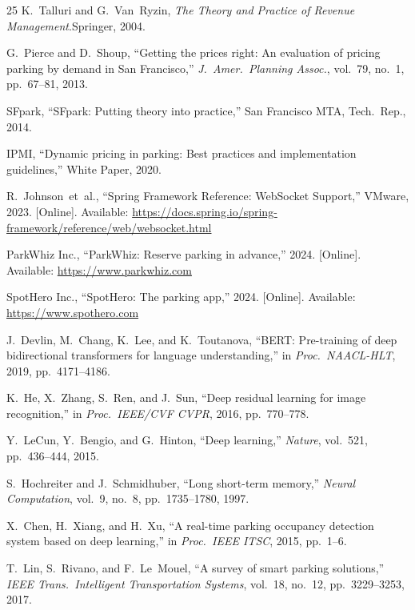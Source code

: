 \documentclass[conference,10pt]{IEEEtran}
\begin{document}
\begin{thebibliography}{25}
K.~Talluri and G.~Van~Ryzin, \emph{The Theory and Practice of Revenue Management}.\quad Springer, 2004.

G.~Pierce and D.~Shoup, ``Getting the prices right: An evaluation of pricing parking by demand in San Francisco,'' \emph{J.\ Amer.\ Planning Assoc.}, vol.~79, no.~1, pp.~67--81, 2013.

SFpark, ``SFpark: Putting theory into practice,'' San Francisco MTA, Tech.\ Rep., 2014.

IPMI, ``Dynamic pricing in parking: Best practices and implementation guidelines,'' White Paper, 2020.

R.~Johnson~et~al., ``Spring Framework Reference: WebSocket Support,'' VMware, 2023. [Online]. Available: \url{https://docs.spring.io/spring-framework/reference/web/websocket.html}

ParkWhiz Inc., ``ParkWhiz: Reserve parking in advance,'' 2024. [Online]. Available: \url{https://www.parkwhiz.com}

SpotHero Inc., ``SpotHero: The parking app,'' 2024. [Online]. Available: \url{https://www.spothero.com}

J.~Devlin, M.~Chang, K.~Lee, and K.~Toutanova, ``BERT: Pre-training of deep bidirectional transformers for language understanding,'' in \emph{Proc.\ NAACL-HLT}, 2019, pp.~4171--4186.

K.~He, X.~Zhang, S.~Ren, and J.~Sun, ``Deep residual learning for image recognition,'' in \emph{Proc.\ IEEE/CVF CVPR}, 2016, pp.~770--778.

Y.~LeCun, Y.~Bengio, and G.~Hinton, ``Deep learning,'' \emph{Nature}, vol.~521, pp.~436--444, 2015.

S.~Hochreiter and J.~Schmidhuber, ``Long short-term memory,'' \emph{Neural Computation}, vol.~9, no.~8, pp.~1735--1780, 1997.

X.~Chen, H.~Xiang, and H.~Xu, ``A real-time parking occupancy detection system based on deep learning,'' in \emph{Proc.\ IEEE ITSC}, 2015, pp.~1--6.

T.~Lin, S.~Rivano, and F.~Le~Mouel, ``A survey of smart parking solutions,'' \emph{IEEE Trans.\ Intelligent Transportation Systems}, vol.~18, no.~12, pp.~3229--3253, 2017.

\end{thebibliography}
\end{document}
